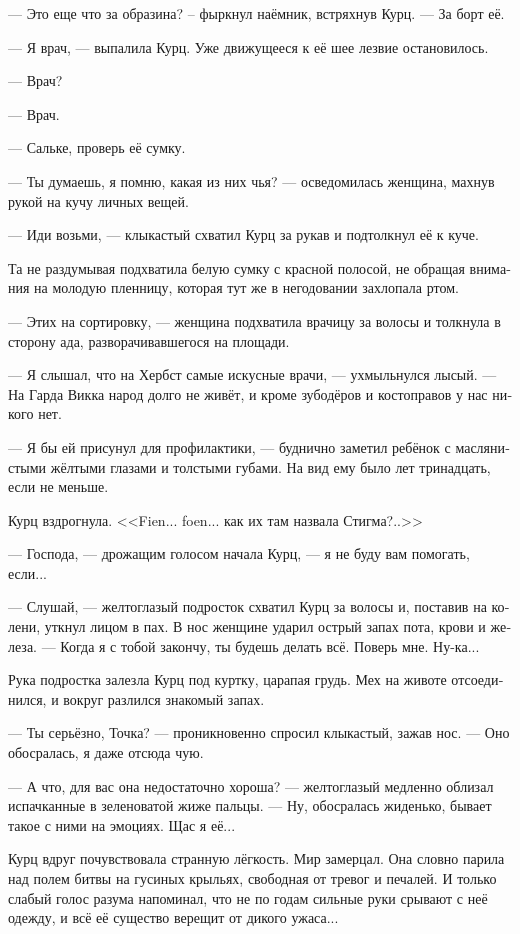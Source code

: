 \documentclass[a4paper,12pt,fleqn]{book}\usepackage{cooltooltips}\usepackage{polyglossia}\setdefaultlanguage[babelshorthands=true]{russian}\setotherlanguage{english}\defaultfontfeatures{Ligatures=TeX,Mapping=tex-text} \usepackage{xcolor}\definecolor{lightgray}{HTML}{bbbbbb}\color{lightgray}\newcommand{\ml}[3]{\textenglish{\textcolor{black}{#3}}}
\begin{document}
--- Это еще что за образина? -- фыркнул наёмник, встряхнув Курц.
--- За борт её.

--- Я врач, --- выпалила Курц.
Уже движущееся к её шее лезвие остановилось.

--- Врач?

--- Врач.

--- Сальке, проверь её сумку.

--- Ты думаешь, я помню, какая из них чья? --- осведомилась женщина, махнув рукой на кучу личных вещей.

--- Иди возьми, --- клыкастый схватил Курц за рукав и подтолкнул её к куче.

Та не раздумывая подхватила белую сумку с красной полосой, не обращая внимания на молодую пленницу, которая тут же в негодовании захлопала ртом.

--- Этих на сортировку, --- женщина подхватила врачицу за волосы и толкнула в сторону ада, разворачивавшегося на площади.

--- Я слышал, что на Хербст самые искусные врачи, --- ухмыльнулся лысый.
--- На Гарда Викка народ долго не живёт, и кроме зубодёров и костоправов у нас никого нет.

--- Я бы ей присунул для профилактики, --- буднично заметил ребёнок с маслянистыми жёлтыми глазами и толстыми губами.
На вид ему было лет тринадцать, если не меньше.

Курц вздрогнула.
<<Fien... foen... как их там назвала Стигма?..>>

--- Господа, --- дрожащим голосом начала Курц, --- я не буду вам помогать, если...

--- Слушай, --- желтоглазый подросток схватил Курц за волосы и, поставив на колени, уткнул лицом в пах.
В нос женщине ударил острый запах пота, крови и железа.
--- Когда я с тобой закончу, ты будешь делать всё.
Поверь мне.
Ну-ка...

Рука подростка залезла Курц под куртку, царапая грудь.
Мех на животе отсоединился, и вокруг разлился знакомый запах.

--- Ты серьёзно, Точка? --- проникновенно спросил клыкастый, зажав нос.
--- Оно обосралась, я даже отсюда чую.

--- А что, для вас она недостаточно хороша? --- желтоглазый медленно облизал испачканные в зеленоватой жиже пальцы.
--- Ну, обосралась жиденько, бывает такое с ними на эмоциях.
Щас я её...

Курц вдруг почувствовала странную лёгкость.
Мир замерцал.
Она словно парила над полем битвы на гусиных крыльях, свободная от тревог и печалей.
И только слабый голос разума напоминал, что не по годам сильные руки срывают с неё одежду, и всё её существо верещит от дикого ужаса...
\end{document}
